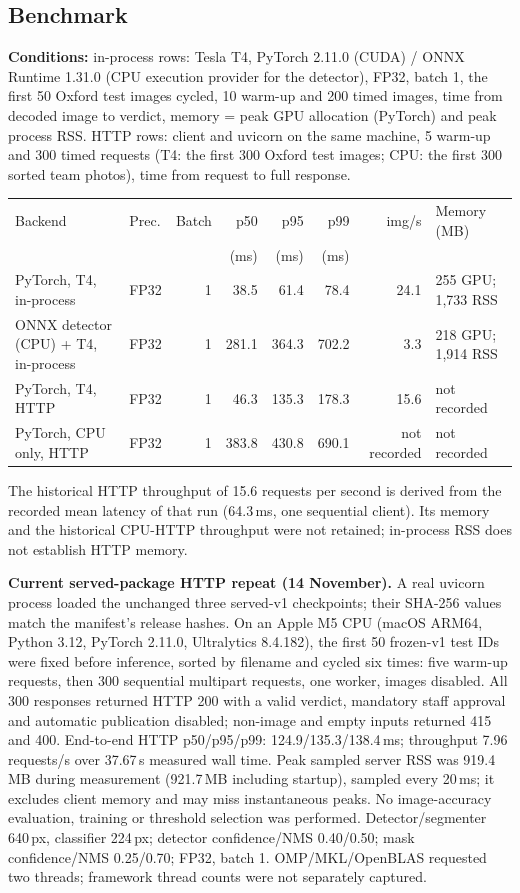 \documentclass[11pt,a4paper]{article}
\begin{document}
\subsection{Benchmark}

\textbf{Conditions:} in-process rows: Tesla T4, PyTorch 2.11.0 (CUDA) / ONNX Runtime 1.31.0 (CPU execution provider for the detector), FP32, batch 1, the first 50 Oxford test images cycled, 10 warm-up and 200 timed images, time from decoded image to verdict, memory = peak GPU allocation (PyTorch) and peak process RSS. HTTP rows: client and uvicorn on the same machine, 5 warm-up and 300 timed requests (T4: the first 300 Oxford test images; CPU: the first 300 sorted team photos), time from request to full response.

{\small
\begin{tabularx}{\linewidth}{@{}p{4.3cm} l r r r r r X@{}}
\toprule
Backend & Prec. & Batch & p50 & p95 & p99 & img/s & Memory (MB) \\
 & & & (ms) & (ms) & (ms) & & \\
\midrule

PyTorch, T4, in-process & FP32 & 1 & 38.5 & 61.4 & 78.4 & 24.1 & 255 GPU; 1,733 RSS \\
ONNX detector (CPU) + T4, in-process & FP32 & 1 & 281.1 & 364.3 & 702.2 & 3.3 & 218 GPU; 1,914 RSS \\
PyTorch, T4, HTTP & FP32 & 1 & 46.3 & 135.3 & 178.3 & 15.6 & not recorded \\
PyTorch, CPU only, HTTP & FP32 & 1 & 383.8 & 430.8 & 690.1 & not recorded & not recorded \\
\bottomrule
\end{tabularx}}

The historical HTTP throughput of 15.6 requests per second is derived from the recorded mean latency of that run (64.3\,ms, one sequential client). Its memory and the historical CPU-HTTP throughput were not retained; in-process RSS does not establish HTTP memory.

\textbf{Current served-package HTTP repeat (14 November).} A real uvicorn process loaded the unchanged three served-v1 checkpoints; their SHA-256 values match the manifest's release hashes. On an Apple M5 CPU (macOS ARM64, Python 3.12, PyTorch 2.11.0, Ultralytics 8.4.182), the first 50 frozen-v1 test IDs were fixed before inference, sorted by filename and cycled six times: five warm-up requests, then 300 sequential multipart requests, one worker, images disabled. All 300 responses returned HTTP 200 with a valid verdict, mandatory staff approval and automatic publication disabled; non-image and empty inputs returned 415 and 400. End-to-end HTTP p50/p95/p99: 124.9/135.3/138.4\,ms; throughput 7.96 requests/s over 37.67\,s measured wall time. Peak sampled server RSS was 919.4\,MB during measurement (921.7\,MB including startup), sampled every 20\,ms; it excludes client memory and may miss instantaneous peaks. No image-accuracy evaluation, training or threshold selection was performed. Detector/segmenter 640\,px, classifier 224\,px; detector confidence/NMS 0.40/0.50; mask confidence/NMS 0.25/0.70; FP32, batch 1. OMP/MKL/OpenBLAS requested two threads; framework thread counts were not separately captured.
\end{document}
